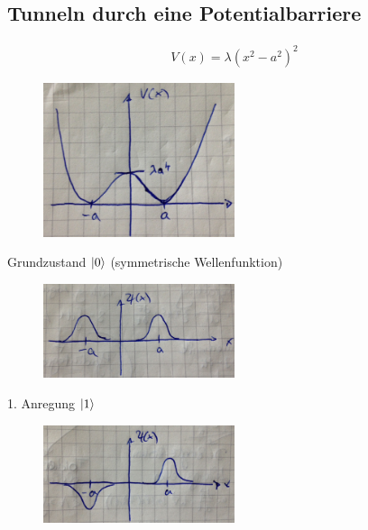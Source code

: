 \subsection{Tunneln durch eine Potentialbarriere}
	\begin{align*}
		V(x) = \lambda(x^2- a^2)^2
	\end{align*}
	\begin{figure}
		\begin{center}
			\includegraphics[width= 0.5\textwidth]{Tunneln_durch_eine_Potentialbarriere1}
		\end{center}
	\end{figure}
\FloatBarrier
Grundzustand $\ket{0}$ (symmetrische Wellenfunktion)
\FloatBarrier
	\begin{figure}[h]
		\begin{center}
			\includegraphics[width= 0.5\textwidth]{Tunneln_durch_eine_Potentialbarriere2}
		\end{center}
	\end{figure}
1. Anregung $\ket{1}$
	\begin{figure} [h]
		\begin{center}
			\includegraphics[width= 0.5\textwidth]{Tunneln_durch_eine_Potentialbarriere3}
		\end{center}
	\end{figure}
